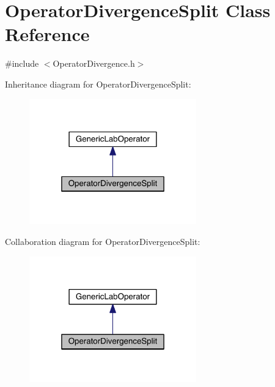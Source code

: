 \hypertarget{class_operator_divergence_split}{}\section{Operator\+Divergence\+Split Class Reference}
\label{class_operator_divergence_split}


{\ttfamily \#include $<$Operator\+Divergence.\+h$>$}



Inheritance diagram for Operator\+Divergence\+Split\+:\nopagebreak
\begin{figure}[H]
\begin{center}
\leavevmode
\includegraphics[width=205pt]{df/d03/class_operator_divergence_split__inherit__graph}
\end{center}
\end{figure}


Collaboration diagram for Operator\+Divergence\+Split\+:\nopagebreak
\begin{figure}[H]
\begin{center}
\leavevmode
\includegraphics[width=205pt]{da/d04/class_operator_divergence_split__coll__graph}
\end{center}
\end{figure}
